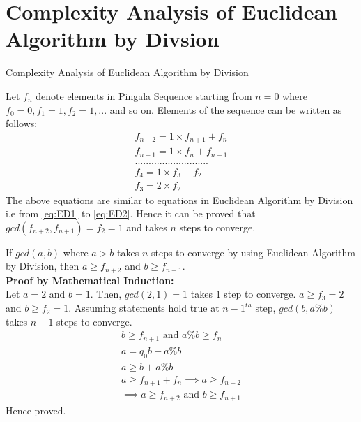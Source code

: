 \documentclass[8pt]{beamer}
\begin{document}
\section{Complexity Analysis of Euclidean Algorithm by Divsion}
\begin{frame}[allowframebreaks]{Complexity Analysis of Euclidean Algorithm by Division}

Let $f_{n}$ denote elements in Pingala Sequence starting from $n=0$ where $f_{0} = 0, f_{1} = 1, f_{2} = 1,...$ and so on. Elements of the sequence can be written as follows:
\begin{align*}
f_{n+2} = 1 \times f_{n+1} + f_{n}\\
f_{n+1} = 1 \times f_{n} + f_{n-1}\\
...........................\\
f_{4} = 1 \times f_{3} + f_{2}\\
f_{3} = 2 \times f_{2}
\end{align*}
The above equations are similar to equations in Euclidean Algorithm by Division i.e from \eqref{eq:ED1} to \eqref{eq:ED2}. Hence it can be proved that $gcd(f_{n+2}, f_{n+1}) = f_{2} = 1$ and takes $n$ steps to converge.\\

\framebreak

If $gcd(a,b)$ where $a>b$ takes $n$ steps to converge by using Euclidean Algorithm by Division, then $a \geq f_{n+2}$ and $b \geq f_{n+1}$.\\

\textbf{Proof by Mathematical Induction:}\\
Let $a = 2$ and $b = 1$. Then, $gcd(2,1) = 1$ takes $1$ step to converge. $a \geq f_{3} = 2$ and $b \geq f_{2} = 1$. Assuming statements hold true at ${n-1}^{th}$ step, $gcd(b,a\%b)$ takes $n-1$ steps to converge.
\begin{align}
b \geq f_{n+1} \text{ and } a\%b \geq f_{n}\\
a = q_{0}b + a\%b\\
a \geq b + a\%b\\
a \geq f_{n+1} + f_{n} \implies a \geq f_{n+2} \\
\implies a \geq f_{n+2} \text{ and } b \geq f_{n+1}
\end{align}
Hence proved.\\


\end{frame}
\end{document}
